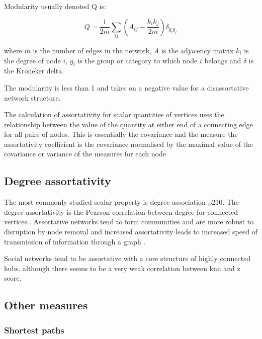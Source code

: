 Modularity usually denoted Q is:

\begin{equation}
    Q = \frac{1}{2m}\sum_{ij}(A_{ij}-\frac{k_ik_j}{2m})\delta_{g_ig_j}
\end{equation}

where $m$ is the number of edges in the network, $A$ is the adjacency matrix $k_i$ is the degree of node $i$, $g_i$ is the group or category to which node $i$ belongs and $\delta$ is the Kroneker delta. 

The modularity is less than 1 and takes on a negative value for a disassortative network structure.

The calculation of assortativity for scalar quantities of vertices uses the relationship between the value of the quantity at either end of a connecting edge for all pairs of nodes. This is essentially the covariance and the measure the assortativity coefficient is the covariance normalised by the maximal value of the covariance or variance of the measures for each node 

\subsection{Degree assortativity}
\label{sec:degree assortativity}

The most commonly studied scalar property is degree association \cite{newman2018networks}p210. The degree assortativity is the Pearson correlation between degree for connected vertices.\cite{noldus2015assortativity}. Assortative networks tend to form communities and are more robust to disruption by node removal  \cite{newman2002assortative} and increased assortativity leads to increased speed of transmission of information through a graph \cite{noldus2015assortativity}.

Social networks tend to be assortative with a core structure of highly connected hubs. \cite{newman2018networks}
 although there seems to be a very weak correlation between knn and z score. 



\subsection{Other measures}
\subsubsection{Shortest paths}


